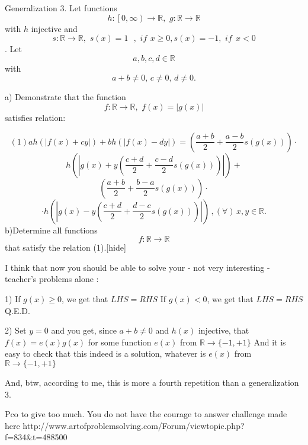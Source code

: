 \begin{solution}Generalization 3.
Let functions \[h:\left[ 0,\infty  \right)\to \mathbb{R},\,\,g:\mathbb{R}\to \mathbb{R}\] with $h$ injective and   \[s:\mathbb{R}\to \mathbb{R},\,\,s(x)=1\ \ \ ,\,\,if\,\ x\ge 0,s(x)=-1,\,\,if\ \ x<0\]. Let \[a,b,c,d\in \mathbb{R}\] with \[a+b\ne 0,\,c\ne 0,\,d\ne 0.\]

a) Demonstrate that the function \[f:\mathbb{R}\to \mathbb{R},\,\,f(x)=\left| g(x) \right|\] satisfies relation:
    
   \[\left( 1 \right)ah\left( \left| f(x)+cy \right| \right)+bh\left( \left| f(x)-dy \right| \right)=\left( \frac{a+b}{2}+\frac{a-b}{2}s\left( g(x) \right) \right)\cdot \]
\[h\left( \left| g(x)+y\left( \frac{c+d}{2}+\frac{c-d}{2}s\left( g(x) \right) \right) \right| \right)+\]\[\left( \frac{a+b}{2}+\frac{b-a}{2}s\left( g(x) \right) \right)\cdot \]
\[\cdot h\left( \left| g(x)-y\left( \frac{c+d}{2}+\frac{d-c}{2}s\left( g(x) \right) \right) \right| \right)\,,\left( \forall  \right)\,x,y\in \mathbb{R}.\]
b)Determine all functions \[f:\mathbb{R}\to \mathbb{R}\] that satisfy the relation (1).[\/hide]
\end{solution}



\begin{solution}
	I think that now you should be able to solve your - not very interesting - teacher's problems alone :

1) 
If $g(x)\ge 0$, we get that $LHS=RHS$
If $g(x)<0$, we get that $LHS=RHS$
Q.E.D.

2)
Set $y=0$ and you get, since $a+b\ne 0$ and $h(x)$ injective, that $f(x)=e(x)g(x)$ for some function $e(x)$  from $\mathbb R\to\{-1,+1\}$
And it is easy to check that this indeed is a solution, whatever is $e(x)$  from $\mathbb R\to\{-1,+1\}$

And, btw, according to me, this is more a fourth repetition than a generalization 3.
\end{solution}



\begin{solution}
	Pco to give too much.
You do not have the courage to answer challenge made here
http://www.artofproblemsolving.com/Forum/viewtopic.php?f=834&t=488500
\end{solution}



